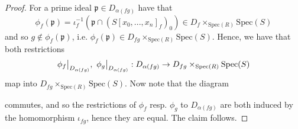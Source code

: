 \documentclass{scrartcl}
\newcommand{\p}{\mathfrak{p}}
\newcommand{\Spec}{\mathrm{Spec}}
\newcommand\restr[2]{{
    \left.\kern-\nulldelimiterspace
    #1
    \vphantom{\big|}
    \right|_{#2}
}}
\theoremstyle{definition}
\begin{document}
\begin{proof}
    For a prime ideal $\p \in D_{\alpha(fg)}$ have that
    \begin{equation*}
        \phi_f(\p) = \iota_f^{-1}(\p \cap (S[x_0, ..., x_n]_f)_0) \in D_f \times_{\Spec(R)} \Spec(S)
    \end{equation*}
    and so $g \notin \phi_f(\p)$, i.e. $\phi_f(\p) \in D_{fg} \times_{\Spec(R)} \Spec(S)$.
    Hence, we have that both restrictions
    \begin{equation*}
        \restr{\phi_f}{D_{\alpha(fg)}}, \ \restr{\phi_g}{D_{\alpha(fg)}}: D_{\alpha(fg)} \to D_{fg} \times_{\Spec(R)} \Spec(S)
    \end{equation*}
    map into $D_{fg} \times_{\Spec(R)} \Spec(S)$.
    Now note that the diagram
    \begin{center}
    \end{center}
    commutes, and so the restrictions of $\phi_f$ resp. $\phi_g$ to $D_{\alpha(fg)}$ are both induced by the homomorphism $\iota_{fg}$, hence they are equal.
    The claim follows.
\end{proof}
\printbibliography
\end{document}
